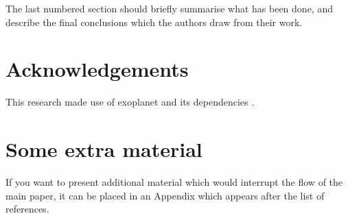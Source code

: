 \documentclass[fleqn,usenatbib]{mnras}
\begin{document}
The last numbered section should briefly summarise what has been done, and describe
the final conclusions which the authors draw from their work.

\section*{Acknowledgements}
This research made use of \textsf{exoplanet} \citep{exoplanet} and its
dependencies \citep{exoplanet:agol19, exoplanet:astropy13, exoplanet:astropy18,
exoplanet:exoplanet, exoplanet:foremanmackey17, exoplanet:foremanmackey18,
exoplanet:luger18, exoplanet:pymc3, exoplanet:theano}.











\appendix

\section{Some extra material}

If you want to present additional material which would interrupt the flow of the main paper,
it can be placed in an Appendix which appears after the list of references.



\bsp	%
\label{lastpage}
\end{document}
